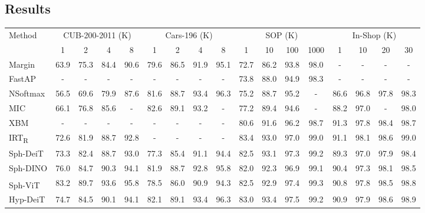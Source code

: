 \documentclass[10pt,twocolumn,letterpaper]{article}
\begin{document}
\subsection{Results}
\label{sec:results}

\setlength{\tabcolsep}{0.47em}
\begin{table*}
  \centering
  \begin{tabular}{l|cccc|cccc|cccc|cccc}
    \toprule
    \multirow{2}{*}{Method} &
    \multicolumn{4}{c|}{CUB-200-2011 (K)} &
    \multicolumn{4}{c|}{Cars-196 (K)} &
    \multicolumn{4}{c|}{SOP (K)} &
    \multicolumn{4}{c}{In-Shop (K)} \\
    &
    1 & 2 & 4 & 8 &
    1 & 2 & 4 & 8 &
    1 & 10 & 100 & 1000 &
    1 & 10 & 20 & 30 \\
    \midrule
Margin \cite{Margin} &
    63.9 & 75.3 & 84.4 & 90.6 &
    79.6 & 86.5 & 91.9 & 95.1 &
    72.7 & 86.2 & 93.8 & 98.0 &
    - & - & - & - \\
    FastAP \cite{FastAP} &
    - & - & - & - &
    - & - & - & - &
    73.8 & 88.0 & 94.9 & 98.3 &
    - & - & - & - \\
    NSoftmax \cite{NSoftmax} &
    56.5 & 69.6 & 79.9 & 87.6 &
    81.6 & 88.7 & 93.4 & 96.3 &
    75.2 & 88.7 & 95.2 & - &
    86.6 & 96.8 & 97.8 & 98.3 \\
    MIC \cite{MIC} &
    66.1 & 76.8 & 85.6 & - &
    82.6 & 89.1 & 93.2 & - &
    77.2 & 89.4 & 94.6 & - &
    88.2 & 97.0 & - & 98.0 \\
    XBM \cite{XBM} &
    - & - & - & - &
    - & - & - & - &
    80.6 & 91.6 & 96.2 & 98.7 &
    91.3 & 97.8 & 98.4 & 98.7 \\
    IRT\textsubscript{R} \cite{IRT} &
    72.6 & 81.9 & 88.7 & 92.8 &
    - & - & - & - &
    83.4 & 93.0 & 97.0 & 99.0 &
    91.1 & 98.1 & 98.6 & 99.0 \\
    \midrule
    Sph-DeiT &
    73.3 & 82.4 & 88.7 & 93.0 &
    77.3 & 85.4 & 91.1 & 94.4 &
    82.5 & 93.1 & 97.3 & 99.2 &
    89.3 & 97.0 & 97.9 & 98.4 \\
    Sph-DINO &
    76.0 & 84.7 & 90.3 & 94.1 &
    81.9 & 88.7 & 92.8 & 95.8 &
    82.0 & 92.3 & 96.9 & 99.1 &
    90.4 & 97.3 & 98.1 & 98.5 \\
    Sph-ViT \textsuperscript{} &
    83.2 & 89.7 & 93.6 & 95.8 &
    78.5 & 86.0 & 90.9 & 94.3 &
    82.5 & 92.9 & 97.4 & 99.3 &
    90.8 & 97.8 & 98.5 & 98.8 \\
    Hyp-DeiT &
    74.7 & 84.5 & 90.1 & 94.1 &
    82.1 & 89.1 & 93.4 & 96.3 &
    83.0 & 93.4 & 97.5 & 99.2 &
    90.9 & 97.9 & 98.6 & 98.9 \\

\end{tabular}
\end{table*}
\end{document}
